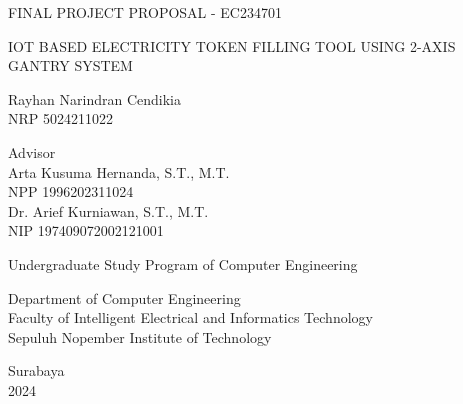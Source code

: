 \begin{large}
  FINAL PROJECT PROPOSAL - EC234701
\end{large}

\vspace{\fill}

\begin{spacing}{1.5}
  \begin{Large}
    IOT BASED ELECTRICITY TOKEN FILLING TOOL USING 2-AXIS GANTRY SYSTEM
  \end{Large}
\end{spacing}

\vspace{\fill}

\begin{large}
  Rayhan Narindran Cendikia \\
  \textmd{NRP 5024211022}
\end{large}

\vspace{\fill}

\begin{large}
  \textmd{Advisor} \\
  Arta Kusuma Hernanda, S.T., M.T. \\
  \textmd{NPP 1996202311024} \\
  Dr. Arief Kurniawan, S.T., M.T. \\
  \textmd{NIP 197409072002121001}
\end{large}

\vspace{\fill}

Undergraduate Study Program of Computer Engineering \\

\mdseries

Department of Computer Engineering \\
Faculty of Intelligent Electrical and Informatics Technology \\
Sepuluh Nopember Institute of Technology

Surabaya \\
2024

